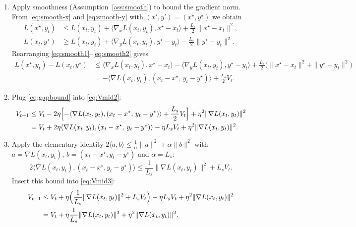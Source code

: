 \documentclass[11pt]{article}
\begin{document}
\begin{enumerate}
\item[Step 4.] Apply smoothness (Assumption~\ref{ass:smooth}) to bound the gradient norm. From \eqref{eq:smooth-x} and \eqref{eq:smooth-y} with $(x',y')=(x^{\star},y^{\star})$ we obtain
\begin{align}
L(x^{\star},y_{t}) &\le L(x_{t},y_{t})
      +\langle \nabla_{x}L(x_{t},y_{t}),x^{\star}-x_{t}\rangle
      +\frac{L_{s}}{2}\|x^{\star}-x_{t}\|^{2},\label{eq:smooth1}\\
L(x_{t},y^{\star}) &\ge L(x_{t},y_{t})
      +\langle \nabla_{y}L(x_{t},y_{t}),y^{\star}-y_{t}\rangle
      -\frac{L_{s}}{2}\|y^{\star}-y_{t}\|^{2}.\label{eq:smooth2}
\end{align}
Rearranging \eqref{eq:smooth1}–\eqref{eq:smooth2} gives
\begin{align}
L(x^{\star},y_{t})-L(x_{t},y^{\star})
   &\le \langle \nabla_{x}L(x_{t},y_{t}),x^{\star}-x_{t}\rangle
        -\langle \nabla_{y}L(x_{t},y_{t}),y^{\star}-y_{t}\rangle
        +\frac{L_{s}}{2}\bigl(\|x^{\star}-x_{t}\|^{2}+\|y^{\star}-y_{t}\|^{2}\bigr)\nonumber\\
   &=-\langle \nabla L(x_{t},y_{t}), (x_{t}-x^{\star},\,y_{t}-y^{\star})\rangle
        +\frac{L_{s}}{2}V_{t}. \label{eq:gapbound}
\end{align}

\item[Step 5.] Plug \eqref{eq:gapbound} into \eqref{eq:Vmid2}:
\begin{align}
V_{t+1}&\le V_{t}
   -2\eta\Bigl[-\langle \nabla L(x_{t},y_{t}), (x_{t}-x^{\star},\,y_{t}-y^{\star})\rangle
        +\frac{L_{s}}{2}V_{t}\Bigr]
   +\eta^{2}\|\nabla L(x_{t},y_{t})\|^{2}\nonumber\\
&= V_{t}
   +2\eta\langle \nabla L(x_{t},y_{t}), (x_{t}-x^{\star},\,y_{t}-y^{\star})\rangle
   -\eta L_{s}V_{t}
   +\eta^{2}\|\nabla L(x_{t},y_{t})\|^{2}. \label{eq:Vmid3}
\end{align}

\item[Step 6.] Apply the elementary identity $2\langle a,b\rangle\le \frac{1}{\alpha}\|a\|^{2}+\alpha\|b\|^{2}$ with $a=\nabla L(x_{t},y_{t})$, $b=(x_{t}-x^{\star},y_{t}-y^{\star})$ and $\alpha= L_{s}$:
\[
2\langle \nabla L(x_{t},y_{t}), (x_{t}-x^{\star},y_{t}-y^{\star})\rangle
   \le \frac{1}{L_{s}}\|\nabla L(x_{t},y_{t})\|^{2}+L_{s}V_{t}.
\]
Insert this bound into \eqref{eq:Vmid3}:
\begin{align}
V_{t+1}&\le V_{t}
   +\eta\Bigl(\frac{1}{L_{s}}\|\nabla L(x_{t},y_{t})\|^{2}+L_{s}V_{t}\Bigr)
   -\eta L_{s}V_{t}
   +\eta^{2}\|\nabla L(x_{t},y_{t})\|^{2}\nonumber\\
&= V_{t}
   +\eta\frac{1}{L_{s}}\|\nabla L(x_{t},y_{t})\|^{2}
   +\eta^{2}\|\nabla L(x_{t},y_{t})\|^{2}. \label{eq:Vmid4}
\end{align}


\end{enumerate}
\end{document}
